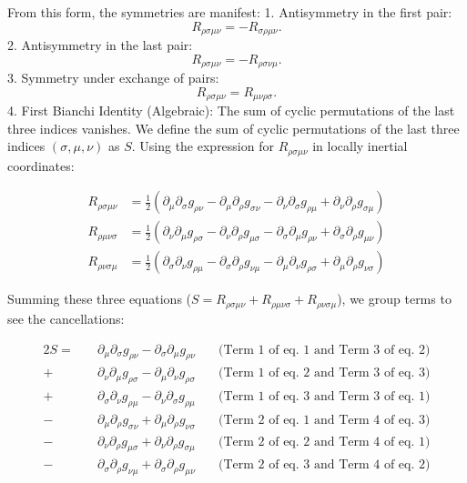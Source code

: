 \documentclass[11pt, a4paper]{report}
\begin{document}
From this form, the symmetries are manifest:
1.  Antisymmetry in the first pair:
    \begin{equation}
    R_{\rho\sigma\mu\nu} = -R_{\sigma\rho\mu\nu}.
    \end{equation}
2.  Antisymmetry in the last pair:
    \begin{equation}
    R_{\rho\sigma\mu\nu} = -R_{\rho\sigma\nu\mu}.
    \end{equation}
3.  Symmetry under exchange of pairs:
    \begin{equation}
    R_{\rho\sigma\mu\nu} = R_{\mu\nu\rho\sigma}.
    \end{equation}
4.  First Bianchi Identity (Algebraic): The sum of cyclic permutations of the last three indices vanishes.
We define the sum of cyclic permutations of the last three indices $(\sigma, \mu, \nu)$ as $S$. Using the expression for $R_{\rho\sigma\mu\nu}$ in locally inertial coordinates:

\begin{align*}
    R_{\rho\sigma\mu\nu} &= \frac{1}{2} \left( \partial_\mu \partial_\sigma g_{\rho\nu} - \partial_\mu \partial_\rho g_{\sigma\nu} - \partial_\nu \partial_\sigma g_{\rho\mu} + \partial_\nu \partial_\rho g_{\sigma\mu} \right) \tag{1} \\
    R_{\rho\mu\nu\sigma} &= \frac{1}{2} \left( \partial_\nu \partial_\mu g_{\rho\sigma} - \partial_\nu \partial_\rho g_{\mu\sigma} - \partial_\sigma \partial_\mu g_{\rho\nu} + \partial_\sigma \partial_\rho g_{\mu\nu} \right) \tag{2} \\
    R_{\rho\nu\sigma\mu} &= \frac{1}{2} \left( \partial_\sigma \partial_\nu g_{\rho\mu} - \partial_\sigma \partial_\rho g_{\nu\mu} - \partial_\mu \partial_\nu g_{\rho\sigma} + \partial_\mu \partial_\rho g_{\nu\sigma} \right) \tag{3}
\end{align*}

Summing these three equations ($S = R_{\rho\sigma\mu\nu} + R_{\rho\mu\nu\sigma} + R_{\rho\nu\sigma\mu}$), we group terms to see the cancellations:

\begin{align*}
    2S = \quad & \partial_\mu \partial_\sigma g_{\rho\nu} - \partial_\sigma \partial_\mu g_{\rho\nu} \quad & \text{(Term 1 of eq. 1 and Term 3 of eq. 2)} \\
    + & \partial_\nu \partial_\mu g_{\rho\sigma} - \partial_\mu \partial_\nu g_{\rho\sigma} \quad & \text{(Term 1 of eq. 2 and Term 3 of eq. 3)} \\
    + & \partial_\sigma \partial_\nu g_{\rho\mu} - \partial_\nu \partial_\sigma g_{\rho\mu} \quad & \text{(Term 1 of eq. 3 and Term 3 of eq. 1)} \\
    - & \partial_\mu \partial_\rho g_{\sigma\nu} + \partial_\mu \partial_\rho g_{\nu\sigma} \quad & \text{(Term 2 of eq. 1 and Term 4 of eq. 3)} \\
    - & \partial_\nu \partial_\rho g_{\mu\sigma} + \partial_\nu \partial_\rho g_{\sigma\mu} \quad & \text{(Term 2 of eq. 2 and Term 4 of eq. 1)} \\
    - & \partial_\sigma \partial_\rho g_{\nu\mu} + \partial_\sigma \partial_\rho g_{\mu\nu} \quad & \text{(Term 2 of eq. 3 and Term 4 of eq. 2)}
\end{align*}
\end{document}
